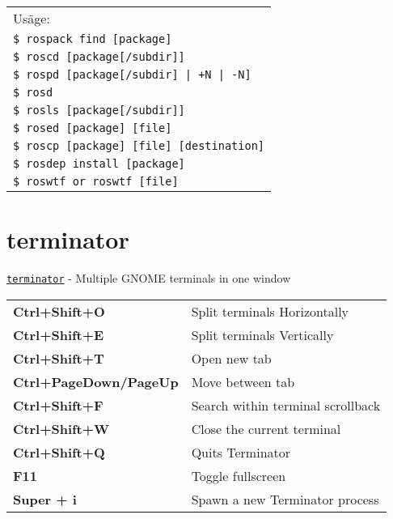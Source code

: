 \documentclass[10pt,landscape]{article}
\begin{document}
\begin{multicols}{3}
\begin{tabular}{l}
Us\=age:\\
\hspace{3ex} \texttt{\$ rospack find [package]}\\
\hspace{3ex} \texttt{\$ roscd [package[/subdir]]}\\
\hspace{3ex} \texttt{\$ rospd [package[/subdir] | +N | -N]}\\
\hspace{3ex} \texttt{\$ rosd}\\
\hspace{3ex} \texttt{\$ rosls [package[/subdir]]}\\
\hspace{3ex} \texttt{\$ rosed [package] [file]}\\
\hspace{3ex} \texttt{\$ roscp [package] [file] [destination]}\\
\hspace{3ex} \texttt{\$ rosdep install [package]}\\
\hspace{3ex} \texttt{\$ roswtf or roswtf [file]}\\
\end{tabular}

\section*{terminator}
\vspace{-0.7em}
\texttt{\href{https://linux.die.net/man/1/terminator}{terminator}} - Multiple GNOME terminals in one window
\begin{tabular}{l l}
\textbf{Ctrl+Shift+O} & Split terminals Horizontally \\
\textbf{Ctrl+Shift+E} & Split terminals Vertically \\
\textbf{Ctrl+Shift+T} & Open new tab \\
\textbf{Ctrl+PageDown/PageUp} & Move between tab \\
\textbf{Ctrl+Shift+F} & Search within terminal scrollback \\
\textbf{Ctrl+Shift+W} & Close the current terminal \\
\textbf{Ctrl+Shift+Q} & Quits Terminator \\
\textbf{F11} & Toggle fullscreen \\
\textbf{Super + i} & Spawn a new Terminator process
\end{tabular}
\vfill

\end{multicols}
 
\end{document}
